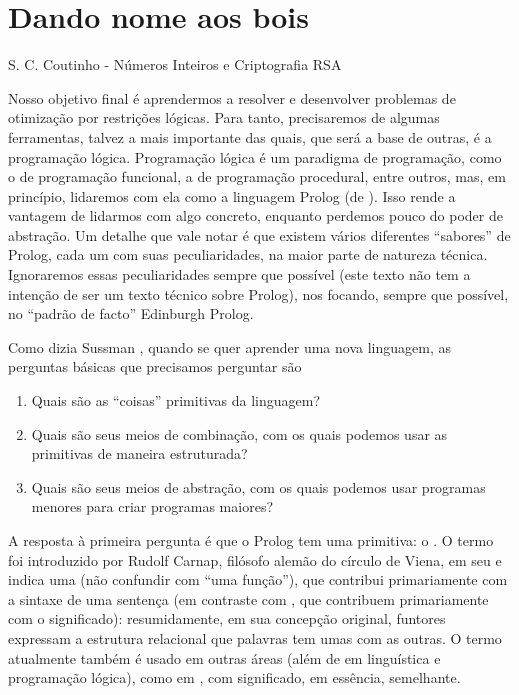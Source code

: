 \documentclass{article}
\begin{document}
\section{Dando nome aos bois}

\epigraph{}{S. C. Coutinho -
Números Inteiros e Criptografia RSA}


Nosso objetivo final é aprendermos a resolver e desenvolver problemas
de otimização por restrições lógicas. Para tanto, precisaremos de
algumas ferramentas, talvez a mais importante das quais, que será a
base de outras, é a programação lógica. Programação lógica é um
paradigma de programação, como o de programação funcional, a de
programação procedural, entre outros, mas, em princípio, lidaremos com
ela como a linguagem Prolog (de ). Isso rende a vantagem de lidarmos com algo concreto,
enquanto perdemos pouco do poder de abstração. Um detalhe que vale
notar é que existem vários diferentes ``sabores'' de Prolog, cada um
com suas peculiaridades, na maior parte de natureza
técnica. Ignoraremos essas peculiaridades sempre que possível (este
texto não tem a intenção de ser um texto técnico sobre Prolog), nos
focando, sempre que possível, no ``padrão de facto'' Edinburgh Prolog.

Como dizia Sussman \cite{sussman} , quando se quer aprender uma nova
linguagem, as perguntas básicas que precisamos perguntar são

\begin{enumerate}
  \item Quais são as ``coisas'' primitivas da linguagem?
  \item Quais são seus meios de combinação, com os quais podemos usar
as primitivas de maneira estruturada?
  \item Quais são seus meios de abstração, com os quais podemos usar
programas menores para criar programas maiores?
\end{enumerate}

A resposta à primeira pergunta é que o Prolog tem uma primitiva: o
. O termo  foi introduzido por
Rudolf Carnap, filósofo alemão do círculo de Viena, em seu
\cite{carnap} e indica uma
 (não confundir com ``uma função''), que
contribui primariamente com a sintaxe de uma sentença (em contraste
com , que contribuem primariamente com o
significado): resumidamente, em sua concepção original, funtores
expressam a estrutura relacional que palavras tem umas com as
outras. O termo atualmente também é usado em outras áreas (além de em
linguística e programação lógica), como em , com significado, em essência, semelhante.
\end{document}
